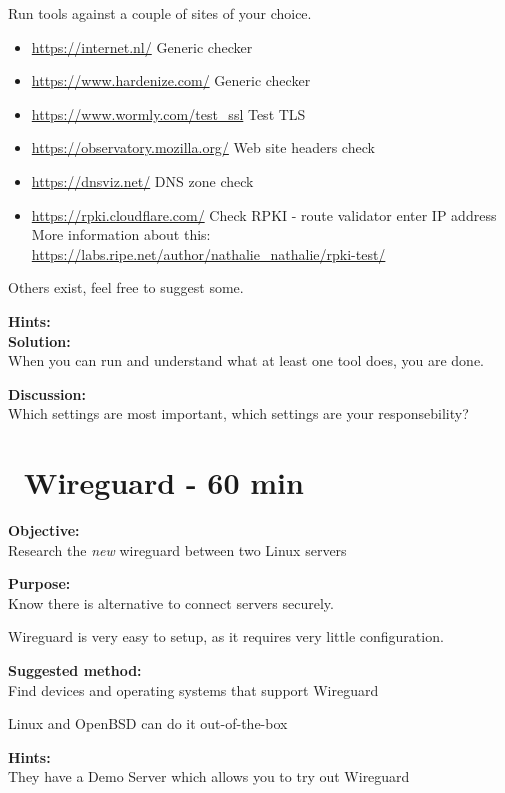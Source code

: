 \documentclass[a4paper,11pt,notitlepage]{report}
\begin{document}
Run tools against a couple of sites of your choice.
\begin{itemize}
\item \url{https://internet.nl/} Generic checker
\item \url{https://www.hardenize.com/} Generic checker
\item \url{https://www.wormly.com/test_ssl} Test TLS
\item \url{https://observatory.mozilla.org/} Web site headers check
\item \url{https://dnsviz.net/} DNS zone check
\item \url{https://rpki.cloudflare.com/} Check RPKI - route validator enter
IP address\\
More information about this: \url{https://labs.ripe.net/author/nathalie_nathalie/rpki-test/}
\end{itemize}

Others exist, feel free to suggest some.

{\bf Hints:}\\

{\bf Solution:}\\
When you can run and understand what at least one tool does, you are done.

{\bf Discussion:}\\
Which settings are most important, which settings are your responsebility?


\chapter{\faInfoCircle\ Wireguard - 60 min}
\label{ex:wireguard-setup}

{\bf Objective:}\\
Research the \emph{new} wireguard between two Linux servers


{\bf Purpose:}\\
Know there is alternative to connect servers securely.

Wireguard is very easy to setup, as it requires very little configuration.


{\bf Suggested method:}\\
Find devices and operating systems that support Wireguard

Linux and OpenBSD can do it out-of-the-box


{\bf Hints:}\\
They have a Demo Server which allows you to try out Wireguard
\end{document}
